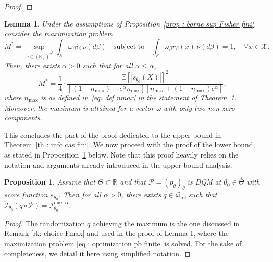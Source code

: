 \documentclass[a4paper, 11pt]{article}
\newtheorem{lem}{Lemma}
\newtheorem{prop}{Proposition}
\theoremstyle{definition}
\newcommand{\E}{{\mathbb{E}}}
\newcommand{\R}{{\mathbb{R}}}
\newcommand{\cI}{{\mathcal{I}}}
\newcommand{\cP}{{\mathcal{P}}}
\newcommand{\cQ}{{\mathcal{Q}}}
\newcommand{\cX}{{\mathcal{X}}}
\begin{document}
{\begin{proof}
\end{proof}


\begin{lem}\label{lem :  determination max fini}
Under the assumptions of Proposition~\ref{prop : borne sup Fisher fini}, consider the maximization problem
\begin{equation} \label{eq : optimization pb finite}
	M^* = \sup_{\omega \in (\R_+)^{2^d}} \int_{\mathcal{E}} \omega_\beta i_\beta \, \nu(d\beta) \quad
	\text{subject to} \quad \int_{\mathcal{E}} \omega_\beta r_\beta(x) \, \nu(d\beta) = 1, \quad \forall x \in \cX.
\end{equation}
Then, there exists $\overline{\alpha} > 0$ such that for all $\alpha \leq \overline{\alpha}$,
\begin{equation} \label{eq : def M star}
	M^* = \frac{1}{4} \cdot \frac{\E\left[ |s_{\theta_0}(X)| \right]^2}{\left[(1 - n_{\max}) + e^\alpha n_{\max} \right] \left[ n_{\max} + (1 - n_{\max}) e^\alpha \right]},
\end{equation}
where $n_{\max}$ is as defined in~\eqref{eq: def nmax} in the statement of Theorem~1. Moreover, the maximum is attained for a vector $\overline{\omega}$ with only two non-zero components.
\end{lem}
	
This concludes the part of the proof dedicated to the upper bound in Theorem~\ref{th : info cas fini}.  
We now proceed with the proof of the lower bound, as stated in Proposition~\ref{prop : borne inf Fisher fini} below.  
Note that this proof heavily relies on the notation and arguments already introduced in the upper bound analysis.





\begin{prop}\label{prop : borne inf Fisher fini}
	Assume that $\Theta \subset \R$ and that $\cP=(p_{\theta})_\theta$ 
	is DQM at $\theta_0 \in \overset{\circ}{\Theta}$ with score function $s_{\theta_0}$.
	Then for all $\alpha>0$, there exists $q \in \cQ_\alpha$, such that $\cI_{\theta_0}(q\circ \cP)=\cI_{\theta_0}^{\text{max},\alpha}$.
\end{prop}
\begin{proof}
The randomization $q$ achieving the maximum is the one discussed in Remark \ref{rk: choice Fmax} and used in the proof of Lemma \ref{lem :  determination max fini},  where the maximization problem \eqref{eq : optimization pb finite} is solved.
For the sake of completeness, we detail it here using simplified notation.


\end{proof}}
\end{document}
